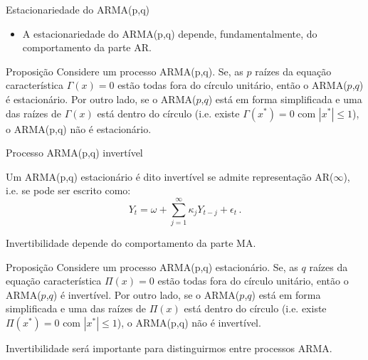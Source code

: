\documentclass[11pt]{beamer}
\newenvironment{halfwideitemize}{\itemize\addtolength{\itemsep}{0.5em}}{\enditemize}
\begin{document}
\begin{frame}{Estacionariedade do ARMA(p,q)}
	\begin{itemize}
		\item A estacionariedade do ARMA(p,q) depende, fundamentalmente, do comportamento da parte AR.
	\end{itemize}
					\begin{block}{Proposição}
		Considere um processo ARMA(p,q). Se, as $p$ raízes da equação característica $\Gamma(x) = 0$ estão todas fora do círculo unitário, então o ARMA($p$,$q$) é estacionário. Por outro lado, se o ARMA($p$,$q$) está em forma simplificada e uma das raízes de $\Gamma(x)$ está dentro do círculo (i.e. existe $\Gamma(x^*)=0$ com $|x^*| \leq 1$), o ARMA(p,q) não é estacionário.
	\end{block}
\end{frame}
\begin{frame}{Processo ARMA(p,q) invertível}
	\begin{halfwideitemize}
		\item 	Um ARMA(p,q) estacionário é dito {\color{blue}invertível} se admite representação AR($\infty$), i.e. se pode ser escrito como:
		$$Y_t = \omega +\sum_{j=1}^\infty \kappa_j Y_{t-j} + \epsilon_t\, .$$
		
		\item Invertibilidade depende do comportamento da parte MA.
		
				\begin{block}{Proposição}
			Considere um processo ARMA(p,q) estacionário. Se, as $q$ raízes da equação característica $\Pi(x) = 0$ estão todas fora do círculo unitário, então o ARMA($p$,$q$) é invertível. Por outro lado, se o ARMA($p$,$q$) está em forma simplificada e uma das raízes de $\Pi(x)$ está dentro do círculo  (i.e. existe $\Pi(x^*)=0$ com $|x^*| \leq 1$), o ARMA(p,q) não é invertível.
		\end{block}
		\item Invertibilidade será importante para distinguirmos entre processos ARMA.
	\end{halfwideitemize}

\end{frame}
\end{document}
